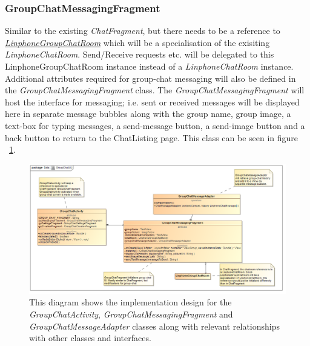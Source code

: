 \documentclass[11pt]{article}
\begin{document}
\subsubsection{GroupChatMessagingFragment}
Similar to the existing \textit{ChatFragment}, but there needs to be a reference to \textit{ \hyperref[subsubsec: linphonegroupchatroom]{LinphoneGroupChatRoom}} which will be a specialisation of the exisiting \textit{LinphoneChatRoom}. Send/Receive requests etc. will be delegated to this LinphoneGroupChatRoom instance instead of a \textit{LinphoneChatRoom} instance. Additional attributes required for group-chat messaging will also be defined in the \textit{GroupChatMessagingFragment} class. 
The \textit{GroupChatMessagingFragment} will host the interface for messaging; i.e. sent or received messages will be displayed here in separate message bubbles along with the group name, group image, a text-box for typing messages, a send-message button, a send-image button and a back button to return to the ChatListing page.
This class can be seen in figure ~\ref{cd-group-chat-messaging-ui}.
\begin{figure}[H]
\centering
\centerline{\includegraphics[width=7in]{./images/class_group_chat_messaging_ui.png}}
\caption[Android Group Chat Messaging UI Class Diagram]{This diagram shows the implementation design for the \textit{GroupChatActivity}, \textit{GroupChatMessagingFragment} and \textit{GroupChatMessageAdapter} classes along with relevant relationships with other classes and interfaces.}
\label{cd-group-chat-messaging-ui}
\end{figure}
\end{document}
